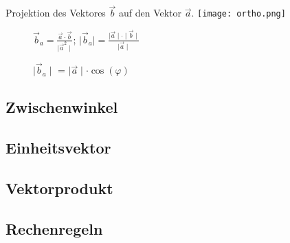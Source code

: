 \begin{multicols*}{3}
Projektion des Vektores $\vec{b} $ auf den Vektor $\vec{a} $.
 \texttt{[image: ortho.png]} 
\begin{wrapfigure}{l}{3.5cm}
 \vspace{-15pt}
\end{wrapfigure}
\begin{wrapfigure}{r}{4.5cm}
 \vspace{-55pt}
 $\vec{b}_a = \frac{\vec{a} \cdot  \vec{b}}{\mid \vec{a}^2 \mid} $; $\mid \vec{b}_a  \mid  = \frac{\mid \vec{a} \mid \cdot \mid \vec{b} \mid}{\mid \vec{a} \mid }$ 

$ \mid \vec{b}_a \mid $ = $\mid \vec{a} \mid \cdot \cos(\varphi)$
\end{wrapfigure}



\WhiteSpace
\subsection{Zwischenwinkel}

\subsection{Einheitsvektor}

\subsection{Vektorprodukt}

\subsection{Rechenregeln}



\WhiteSpace
\newpage
\mbox{}
	
\end{multicols*} 


